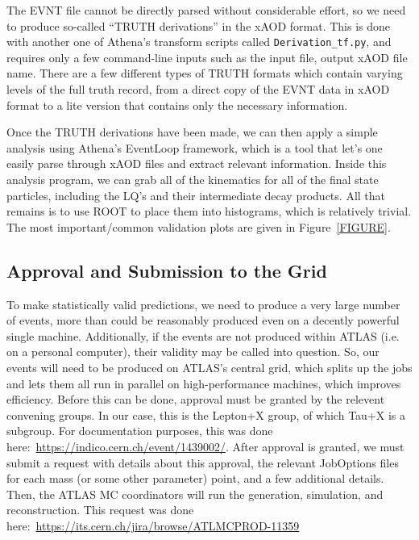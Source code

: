     The EVNT file cannot be directly parsed without considerable effort, so we need to produce so-called ``TRUTH derivations'' in the xAOD format. This is done with another one of Athena's transform scripts called \texttt{Derivation_tf.py}, and requires only a few command-line inputs such as the input file, output xAOD file name. There are a few different types of TRUTH formats which contain varying levels of the full truth record, from a direct copy of the EVNT data in xAOD format to a lite version that contains only the necessary information.

    Once the TRUTH derivations have been made, we can then apply a simple analysis using Athena's EventLoop framework, which is a tool that let's one easily parse through xAOD files and extract relevant information. Inside this analysis program, we can grab all of the kinematics for all of the final state particles, including the LQ's and their intermediate decay products. All that remains is to use ROOT to place them into histograms, which is relatively trivial. The most important/common validation plots are given in Figure~\ref{FIGURE}. 

\subsection{Approval and Submission to the Grid}
    To make statistically valid predictions, we need to produce a very large number of events, more than could be reasonably produced even on a decently powerful single machine. Additionally, if the events are not produced within ATLAS (i.e. on a personal computer), their validity may be called into question. So, our events will need to be produced on ATLAS's central grid, which splits up the jobs and lets them all run in parallel on high-performance machines, which improves efficiency. Before this can be done, approval must be granted by the relevent convening groups. In our case, this is the Lepton+X group, of which Tau+X is a subgroup. For documentation purposes, this was done here:~\url{https://indico.cern.ch/event/1439002/}. After approval is granted, we must submit a request with details about this approval, the relevant JobOptions files for each mass (or some other parameter) point, and a few additional details. Then, the ATLAS MC coordinators will run the generation, simulation, and reconstruction. This request was done here:~\url{https://its.cern.ch/jira/browse/ATLMCPROD-11359}

    
